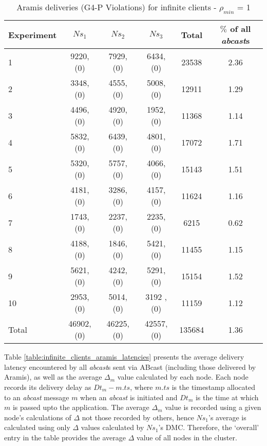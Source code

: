 \begin{table}[p]
  \begin{center}
  \renewcommand{\arraystretch}{1.3}
   \begin{tabular}{|l|c|c|c|c|c|}
    \hline
    Experiment & $Ns_1$ & $Ns_2$       & $Ns_3$      & Total    & $\%$ of all \emph{abcast}s \\ \hline \hline
    1          & 9220, (0)  & 7929, (0)  & 6434, (0)  & 23538 & 2.36 \\ \hline
    2          & 3348, (0)  & 4555, (0)  & 5008, (0)  & 12911 & 1.29 \\ \hline
    3          & 4496, (0)  & 4920, (0)  & 1952, (0)  & 11368 & 1.14 \\ \hline
    4          & 5832, (0)  & 6439, (0)  & 4801, (0)  & 17072 & 1.71 \\ \hline
    5          & 5320, (0)  & 5757, (0)  & 4066, (0)  & 15143 & 1.51 \\ \hline
    6          & 4181, (0)  & 3286, (0)  & 4157, (0)  & 11624 & 1.16 \\ \hline
    7          & 1743, (0)  & 2237, (0)  & 2235, (0)  & 6215   & 0.62 \\ \hline
    8          & 4188, (0)  & 1846, (0)  & 5421, (0)  & 11455 & 1.15 \\ \hline
    9          & 5621, (0)  & 4242, (0)  & 5291, (0)  & 15154 & 1.52 \\ \hline
    10        & 2953, (0)  & 5014, (0)  & 3192 , (0) & 11159 & 1.12 \\ \hline \hline
    Total    &46902, (0) &46225, (0) &42557, (0) &135684 & 1.36\\ \hline
    \end{tabular}
    \caption[Aramis deliveries for Infinite Clients - $\rho_{min}$ = 1]{Aramis deliveries (G4-P Violations) for infinite clients - $\rho_{min}$ = 1}
    \label{table:infinite_clients_rejections}
  \end{center}
\end{table}
    
    Table \ref{table:infinite_clients_aramis_latencies} presents the average delivery latency encountered by all \emph{abcast}s sent via \textsf{ABcast} (including those delivered by \textsf{Aramis}), as well as the average $\Delta_m$ value calculated by each node.  Each node records its delivery delay as $Dt_m - m.ts$, where $m.ts$ is the timestamp allocated to an \emph{abcast} message $m$ when an \emph{abcast} is initiated and $Dt_m$ is the time at which $m$ is passed upto the application.  The average $\Delta_m$ value is recorded using a given node's calculations of $\Delta$ not those recorded by others, hence $Ns_1$'s average is calculated using only $\Delta$ values calculated by $Ns_1$'s DMC.  Therefore, the \textquoteleft{}overall' entry in the table provides the average $\Delta$ value of all nodes in the cluster.  
    
